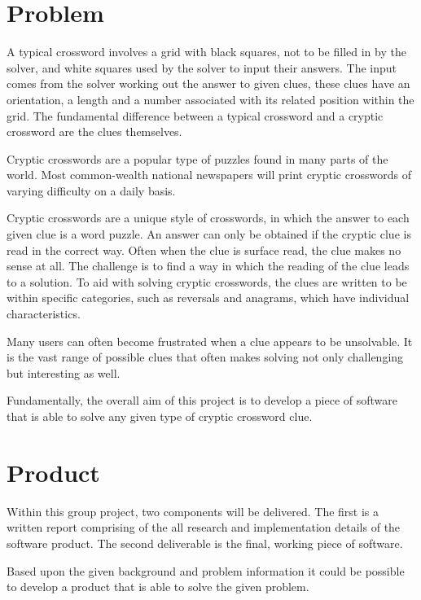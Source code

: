 \section{Problem}

A typical crossword involves a grid with black squares, not to be filled in by
the  solver, and white squares used by the solver to input their answers. The
input comes from the solver working out the answer to given clues, these clues
have an orientation, a length and a number associated with its related position
within the grid. The fundamental difference between a typical crossword and a
cryptic crossword are the clues themselves.

Cryptic crosswords are a popular type of puzzles found in many parts of the
world. Most common-wealth national newspapers will print cryptic crosswords of
varying difficulty on a daily basis.

Cryptic crosswords are a unique style of crosswords, in which the answer to
each given clue is a word puzzle. An answer can only be obtained if the cryptic
clue is read in the correct way. Often when the clue is surface read, the clue
makes no sense at all. The challenge is to find a way in which the reading of
the clue leads to a solution. To aid with solving cryptic crosswords, the clues
are written to be within specific categories, such as reversals and anagrams,
which have individual characteristics.

Many users can often become frustrated when a clue appears to be unsolvable. It
is the vast range of possible clues that often makes solving not only
challenging but interesting as well.

Fundamentally, the overall aim of this project is to develop a piece of
software that is able to solve any given type of cryptic crossword clue.


\section{Product}

Within this group project, two components will be delivered. The first is a 
written report comprising of the all research and implementation details of 
the software product. The second deliverable is the final, working piece of 
software.

Based upon the given background and problem information it could be possible to
develop a product that is able to solve the given problem.

